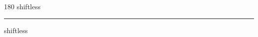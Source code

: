 
\begin{frame}
\begin{center}
\begin{turn}{180}
{\fontsize{2.5cm}{1em}\selectfont shiftless}
\end{turn}
\vspace{1em}\par  
\hrule
\vspace{1em}\par  
{\fontsize{2.5cm}{1em}\selectfont shiftless}
\end{center}
\end{frame}
